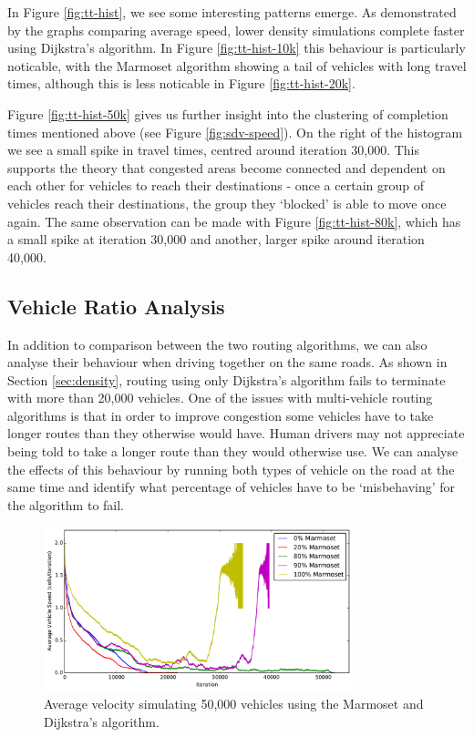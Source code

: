 \documentclass[ %
                    author={Alexander Hill},
                supervisor={Dr. Benjamin Sach},
                    degree={MEng},
                     title={MARMOSET},
                  subtitle={Multi-Agent Route Management using Online Simulation for Efficient Transportation},
                      type={research},
                      year={2016} ]{dissertation}
\begin{document}
In Figure \ref{fig:tt-hist}, we see some interesting patterns emerge. As
demonstrated by the graphs comparing average speed, lower density simulations
complete faster using Dijkstra's algorithm. In Figure \ref{fig:tt-hist-10k}
this behaviour is particularly noticable, with the Marmoset algorithm showing a
tail of vehicles with long travel times, although this is less noticable in
Figure \ref{fig:tt-hist-20k}.

Figure \ref{fig:tt-hist-50k} gives us further insight into the clustering of
completion times mentioned above (see Figure \ref{fig:sdv-speed}). On the
right of the histogram we see a small spike in travel times, centred around
iteration 30,000. This supports the theory that congested areas become
connected and dependent on each other for vehicles to reach their destinations -
once a certain group of vehicles reach their destinations, the group they
`blocked' is able to move once again. The same observation can be made with
Figure \ref{fig:tt-hist-80k}, which has a small spike at iteration 30,000 and
another, larger spike around iteration 40,000.

\subsection{Vehicle Ratio Analysis}

In addition to comparison between the two routing algorithms, we can also
analyse their behaviour when driving together on the same roads. As shown in
Section \ref{sec:density}, routing using only Dijkstra's algorithm fails to
terminate with more than 20,000 vehicles. One of the issues with multi-vehicle
routing algorithms is that in order to improve congestion some vehicles have to
take longer routes than they otherwise would have. Human drivers may not
appreciate being told to take a longer route than they would otherwise use. We
can analyse the effects of this behaviour by running both types of vehicle on
the road at the same time and identify what percentage of vehicles have to be
`misbehaving' for the algorithm to fail.

\begin{figure}[h]
    \centering
    \includegraphics[width=0.8\textwidth]{ratio-av.pdf}
    \caption{Average velocity simulating 50,000 vehicles using the Marmoset and Dijkstra's algorithm.}\label{fig:ratio-av}
\end{figure}
\end{document}
